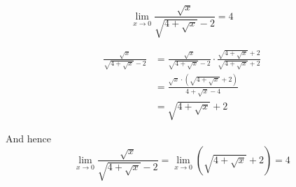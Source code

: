 \documentclass[14pt,fleqn]{extarticle}
\newcommand\ea{4 + \sqrt{x}}
\begin{document}
 
\begin{snippet}
    \correct
    \[ \lim_{x\to 0} \frac{\sqrt{x}}{\sqrt{\ea} - 2} = 4 \]
   
    \reason
    
    \begin{align}
	\frac{\sqrt{x}}{\sqrt{\ea} - 2} &= \frac{\sqrt{x}}{\sqrt{\ea} - 2}\cdot \frac{\sqrt{\ea}+2}{\sqrt{\ea} + 2} \\
	&= \frac{\sqrt{x}\cdot \left(\sqrt{\ea} + 2 \right)}{\ea - 4} \\
	&= \sqrt{\ea} + 2
	\end{align} 
	
	And hence 
	\[\lim_{x\to 0} \frac{\sqrt{x}}{\sqrt{\ea} - 2} = \lim_{x\to 0} \left(\sqrt{\ea} + 2\right) = 4 \]
\end{snippet} 
\end{document}
